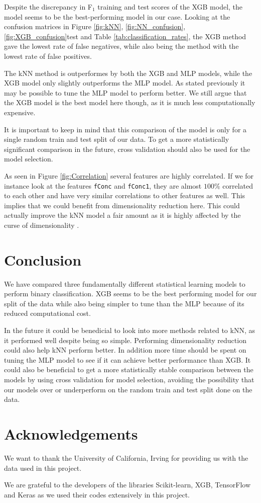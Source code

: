 \documentclass[a4paper, 11pt, twocolumn]{article}
\begin{document}
Despite the discrepancy in F$_1$ training and test scores of the XGB model, the 
model seems to be the best-performing model in our case. Looking at the 
confusion matrices in Figure \ref{fig:kNN}, \ref{fig:NN_confusion}, 
\ref{fig:XGB_confusion}test and Table \ref{tab:classification_rates}, the XGB 
method gave the lowest rate of false negatives, while also 
being the method with the lowest rate of false positives. 

The kNN method is outperformes by both the XGB and MLP models, while the XGB 
model only slightly outperforms the MLP model. As stated previously it may be 
possible to tune the MLP model to perform better. We still argue that the XGB
model is the best model here though, as it is much less computationally expensive.


It is important to keep in mind that this comparison of the model is only for a 
single random train and test split of our data. To get a more statistically 
significant comparison in the future, cross validation should also be used for 
the model selection.

As seen in Figure \ref{fig:Correlation} several features are highly correlated.
If we for instance look at the features \texttt{fConc} and \texttt{fConc1}, 
they are almost $100\%$ correlated to each other and have very similar correlations 
to other features as well. This implies that we could benefit from dimensionality 
reduction here. This could actually improve the kNN model a fair amount as it is 
highly affected by the curse of dimensionality \cite{hastie}.

\section{Conclusion}
We have compared three fundamentally different statistical learning models to 
perform binary classification. XGB seems to be the best performing model for 
our split of the data while also being simpler to tune than the MLP because of 
its reduced computational cost.

In the future it could be benedicial to look into more methods related to kNN, as
it performed well despite being so simple. Performing dimensionality reduction 
could also help kNN perform better.
In addition more time should be spent on tuning the MLP model to see if it can
achieve better performance than XGB. It could also be beneficial to get a 
more statistically stable comparison between the models by using cross validation 
for model selection, avoiding the possibility that our models over or underperform 
on the random train and test split done on the data.

\section*{Acknowledgements}
We want to thank the University of California, Irving for providing us with the
data used in this project.

We are grateful to the developers of the libraries Scikit-learn, XGB, TensorFlow 
and Keras as we used their codes extensively in this project.


%

\end{document}
